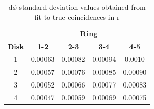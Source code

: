 \begin{table}[H]
  \centering
  \caption[d$\phi$ cut values for two-fold in r]{d$\phi$ standard deviation values obtained from fit to true coincidences in r}
\begin{tabular}{ccccc}
 & \multicolumn{4}{c}{\textbf{Ring}} \\
\textbf{Disk} & \textbf{1-2} & \textbf{2-3} & \textbf{3-4} & \textbf{4-5} \\
\hline
1 & 0.00063 & 0.00082 & 0.00094 & 0.0010 \\
2 & 0.00057 & 0.00076 & 0.00085 & 0.00090 \\
3 & 0.00052 & 0.00066 & 0.00077 & 0.00083 \\
4 & 0.00047 & 0.00059 & 0.00069 & 0.00075 \\
\end{tabular}
\label{tab:my_label_54}
\end{table}



